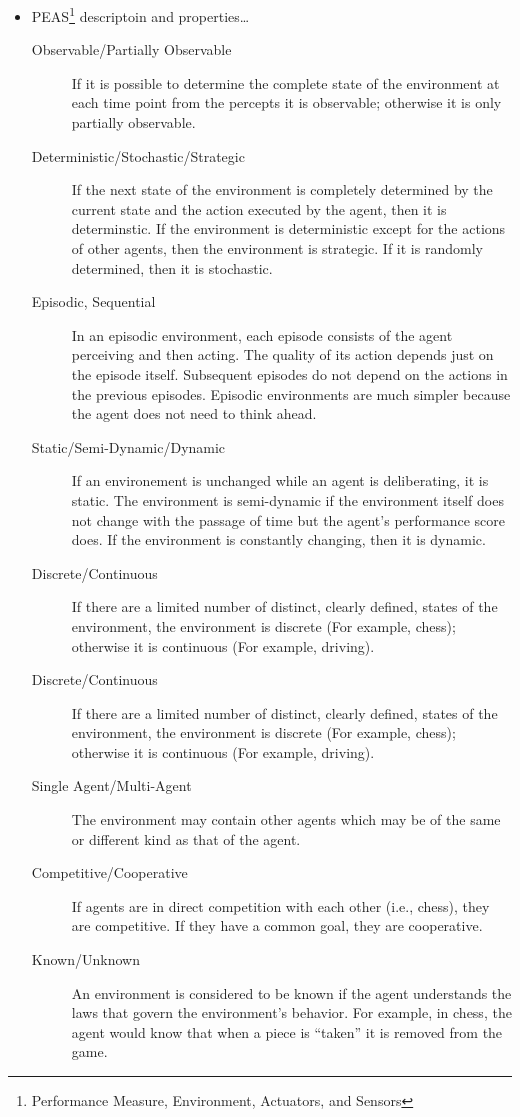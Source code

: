 \begin{itemize}
    \item PEAS\footnote{Performance Measure, Environment, Actuators, and Sensors} descriptoin and properties\ldots
        \begin{description}
            \item[Observable/Partially Observable] If it is possible to determine the complete state of the environment at each time point from the percepts it is observable; otherwise it is only partially observable.
            \item[Deterministic/Stochastic/Strategic] If the next state of the environment is completely determined by the current state and the action executed by the agent, then it is determinstic. If the environment is deterministic except for the actions of other agents, then the environment is strategic. If it is randomly determined, then it is stochastic.
            \item[Episodic, Sequential] In an episodic environment, each episode consists of the agent perceiving and then acting. The quality of its action depends just on the episode itself. Subsequent episodes do not depend on the actions in the previous episodes. Episodic environments are much simpler because the agent does not need to think ahead.
            \item[Static/Semi-Dynamic/Dynamic] If an environement is unchanged while an agent is deliberating, it is static. The environment is semi-dynamic if the environment itself does not change with the passage of time but the agent’s performance score does. If the environment is constantly changing, then it is dynamic.
            \item[Discrete/Continuous] If there are a limited number of distinct, clearly defined, states of the environment, the environment is discrete (For example, chess); otherwise it is continuous (For example, driving).
            \item[Discrete/Continuous] If there are a limited number of distinct, clearly defined, states of the environment, the environment is discrete (For example, chess); otherwise it is continuous (For example, driving).
            \item[Single Agent/Multi-Agent] The environment may contain other agents which may be of the same or different kind as that of the agent.
            \item[Competitive/Cooperative] If agents are in direct competition with each other (i.e., chess), they are competitive. If they have a common goal, they are cooperative.
            \item[Known/Unknown] An environment is considered to be known if the agent understands the laws that govern the environment's behavior. For example, in chess, the agent would know that when a piece is ``taken'' it is removed from the game.
        \end{description}


\end{itemize}
